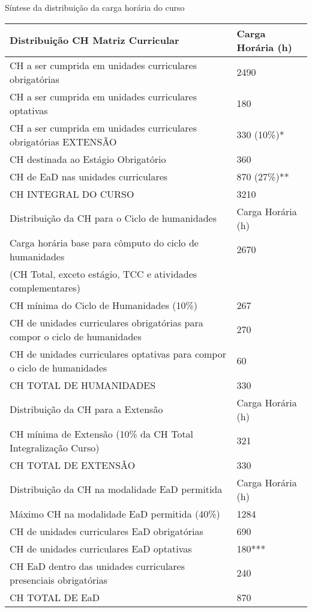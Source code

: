 \begin{quadro}[ht!]
\centering
\caption{Síntese da distribuição da carga horária do curso}

\small
\begin{tabular}{| l | l |}
\hline
\rowcolor{blue1}
Distribuição CH Matriz Curricular & Carga Horária (h)  \\
\hline
CH a ser  cumprida em unidades curriculares obrigatórias & 2490\\ \hline
CH a ser  cumprida em unidades curriculares optativas & 180\\ \hline
CH a ser cumprida em unidades curriculares obrigatórias EXTENSÃO & 330 (10\%)* \\\hline
CH destinada ao Estágio Obrigatório & 360 \\ \hline
CH de EaD nas unidades curriculares & 870 (27\%)** \\ \hline
CH  INTEGRAL DO CURSO & 3210\\ \hline
\rowcolor{blue1}
Distribuição da CH para o Ciclo de humanidades & Carga Horária (h)  \\
\hline
Carga horária base para cômputo do ciclo de humanidades & 2670\\
(CH Total, exceto estágio, TCC e atividades complementares) & \\ \hline
CH mínima do Ciclo de Humanidades (10\%) & 267 \\ \hline
CH de unidades curriculares obrigatórias para compor o ciclo de humanidades & 270 \\ \hline
CH de unidades curriculares optativas para compor o ciclo de humanidades & 60 \\ \hline
CH TOTAL DE HUMANIDADES & 330\\ \hline
\rowcolor{blue1}
Distribuição da CH para a Extensão & Carga Horária (h)  \\
\hline
CH mínima de Extensão (10\% da CH Total Integralização Curso) & 321\\ \hline
CH TOTAL DE EXTENSÃO & 330 \\ \hline
\rowcolor{blue1}
Distribuição da CH na modalidade EaD permitida & Carga Horária (h)  \\
\hline
Máximo CH na modalidade EaD permitida (40\%) & 1284\\ \hline
CH de unidades curriculares EaD obrigatórias & 690 \\ \hline
CH de unidades curriculares EaD optativas & 180***\\ \hline
CH EaD dentro das unidades curriculares presenciais obrigatórias & 240\\ \hline
CH TOTAL DE EaD & 870\\ \hline


\end{tabular}
\end{quadro}
